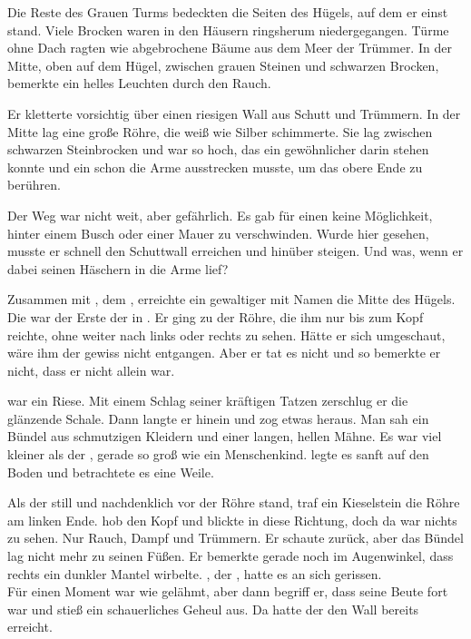 \begin{huge}
Die Reste des Grauen Turms bedeckten die Seiten des Hügels, auf dem er einst stand. Viele Brocken waren in den Häusern ringsherum niedergegangen. Türme ohne Dach ragten wie abgebrochene Bäume aus dem Meer der Trümmer. In der Mitte, oben auf dem Hügel, zwischen grauen Steinen und schwarzen Brocken, bemerkte {\Eno} ein helles Leuchten durch den Rauch. 

Er kletterte vorsichtig über einen riesigen Wall aus Schutt und Trümmern. In der Mitte lag eine große Röhre, die weiß wie Silber schimmerte. Sie lag zwischen schwarzen Steinbrocken und war so hoch, das ein gewöhnlicher \Bangiri darin stehen konnte und ein {\Enlaender} schon die Arme ausstrecken musste, um das obere Ende zu berühren. 

Der Weg war nicht weit, aber gefährlich. Es gab für einen {\Schattenlaufer} keine Möglichkeit, hinter einem Busch oder einer Mauer zu verschwinden. Wurde {\Eno} hier gesehen, musste er schnell den Schuttwall erreichen und hinüber steigen. Und was, wenn er dabei seinen Häschern in die Arme lief?

Zusammen mit {\Eno}, dem {\Schattenlaufer}, erreichte ein gewaltiger {\Bangiri} mit Namen {\Pato} die Mitte des Hügels. Die {\Pato} war der Erste der {\Bangiri} in {\Tern}. Er ging zu der Röhre, die ihm nur bis zum Kopf reichte, ohne weiter nach links oder rechts zu sehen. Hätte er sich umgeschaut, wäre ihm der {\Schattenlaufer} gewiss nicht entgangen. Aber er tat es nicht und so bemerkte er nicht, dass er nicht allein war.

{\Pato} war ein Riese. Mit einem Schlag seiner kräftigen Tatzen zerschlug er die glänzende Schale. Dann langte er hinein und zog etwas heraus. Man sah ein Bündel aus schmutzigen Kleidern und einer langen, hellen Mähne. Es war viel kleiner als der {\Bangiri}, gerade so groß wie ein Menschenkind. {\Pato} legte es sanft auf den Boden und betrachtete es eine Weile. 

Als der {\Bangiri} still und nachdenklich vor der Röhre stand, traf ein Kieselstein die Röhre am linken Ende. {\Pato} hob den Kopf und blickte in diese Richtung, doch da war nichts zu sehen. Nur Rauch, Dampf und Trümmern. Er schaute zurück, aber das Bündel lag nicht mehr zu seinen Füßen. Er bemerkte gerade noch im Augenwinkel, dass rechts ein dunkler Mantel wirbelte. {\Eno}, der {\Schattenjager}, hatte es an sich gerissen.\\
Für einen Moment war {\Pato} wie gelähmt, aber dann begriff er, dass seine Beute fort war und stieß ein schauerliches Geheul aus. Da hatte der {\Schattenjager} den Wall bereits erreicht.


\end{huge}
